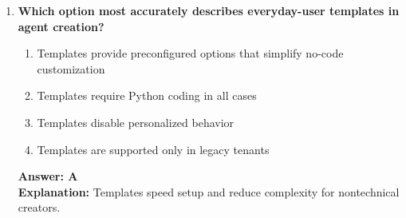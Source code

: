 \documentclass[10pt]{article}
\begin{document}
\begin{enumerate}[leftmargin=*]
\item \textbf{Which option most accurately describes everyday-user templates in agent creation?}
\begin{enumerate}[label=\Alph*.]
  \item Templates provide preconfigured options that simplify no-code customization
  \item Templates require Python coding in all cases
  \item Templates disable personalized behavior
  \item Templates are supported only in legacy tenants
\end{enumerate}
\textbf{Answer: A}\\
\textbf{Explanation:} Templates speed setup and reduce complexity for nontechnical creators.

\end{enumerate}


\clearpage
\end{document}
